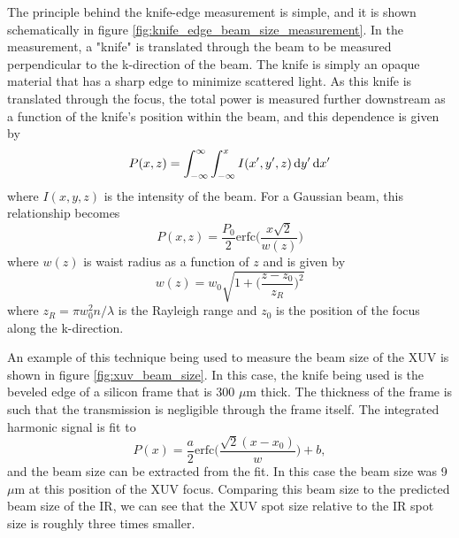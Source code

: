 The principle behind the knife-edge measurement is simple, and it is shown schematically in figure \ref{fig:knife_edge_beam_size_measurement}.  In the measurement, a "knife" is translated through the beam to be measured perpendicular to the k-direction of the beam.  The knife is simply an opaque material that has a sharp edge to minimize scattered light.  As this knife is translated through the focus, the total power is measured further downstream as a function of the knife's position within the beam, and this dependence is given by
\begin{equation}
	\label{eqn:knife_edge_power}
	P(x,z) = \int_{-\infty}^{\infty}\int_{-\infty}^{x}I(x', y',z)\mathop{}\!\mathrm{d} y'\mathop{}\!\mathrm{d} x'
\end{equation} 
where $I(x,y,z)$ is the intensity of the beam.  For a Gaussian beam, this relationship becomes
\begin{equation}
	\label{eqn:knife_edge_power_guassian}
	P(x,z) = \frac{P_0}{2}\mathrm{erfc}\bigg(\frac{x\sqrt{2}}{w(z)}\bigg)
\end{equation}
where $w(z)$ is waist radius as a function of $z$ and is given by
\begin{equation}
	\label{eqn:gaussian_waist_radius}
	w(z)=w_0\sqrt{1+\bigg(\frac{z - z_0}{z_R}\bigg)^2}
\end{equation}
where $z_R=\pi w_0^2 n/\lambda$ is the Rayleigh range and $z_0$ is the position of the focus along the k-direction. 

An example of this technique being used to measure the beam size of the XUV is shown in figure \ref{fig:xuv_beam_size}.  In this case, the knife being used is the beveled edge of a silicon frame that is 300 $\mu$m thick. The thickness of the frame is such that the transmission is negligible through the frame itself.  The integrated harmonic signal is fit to
\begin{equation}
	P(x) = \frac{a}{2}\mathrm{erfc}\bigg(\frac{\sqrt{2}(x-x_0)}{w}\bigg) + b,
\end{equation}
and the beam size can be extracted from the fit.  In this case the beam size was 9 $\mu$m at this position of the XUV focus.  Comparing this beam size to the predicted beam size of the IR, we can see that the XUV spot size relative to the IR spot size is roughly three times smaller.

